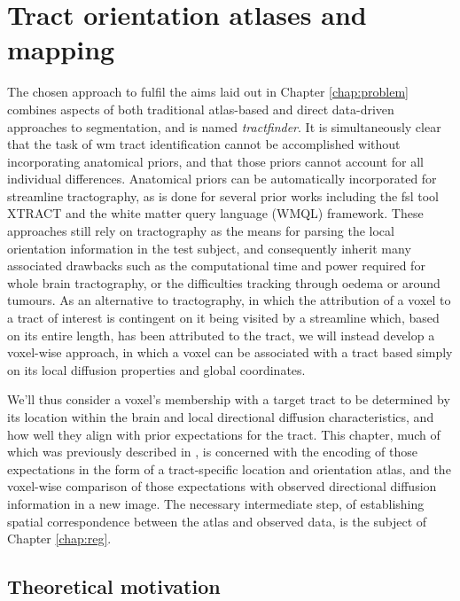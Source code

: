 \chapter{Tract orientation atlases and mapping}
\label{chap:atlas}

The chosen approach to fulfil the aims laid out in Chapter \ref{chap:problem} combines aspects of both traditional atlas-based and direct data-driven approaches to segmentation, and is named \textit{tractfinder}.
It is simultaneously clear that the task of \gls{wm} tract identification cannot be accomplished without incorporating anatomical priors, and that those priors cannot account for all individual differences.
Anatomical priors can be automatically incorporated for streamline tractography, as is done for several prior works including the \gls{fsl} tool XTRACT\autocite{Warrington2020} and the white matter query language (WMQL) framework\autocite{Wassermann2016}.
These approaches still rely on tractography as the means for parsing the local orientation information in the test subject, and consequently inherit many associated drawbacks such as the computational time and power required for whole brain tractography, or the difficulties tracking through oedema or around tumours.
As an alternative to tractography, in which the attribution of a voxel to a tract of interest is contingent on it being visited by a streamline which, based on its entire length, has been attributed to the tract, we will instead develop a voxel-wise approach, in which a voxel can be associated with a tract based simply on its local diffusion properties and global coordinates.

We'll thus consider a voxel's membership with a target tract to be determined by its location within the brain and local directional diffusion characteristics, and how well they align with prior expectations for the tract.
This chapter, much of which was previously described in \textcite{Young2024}, is concerned with the encoding of those expectations in the form of a tract-specific location and orientation atlas, and the voxel-wise comparison of those expectations with observed directional diffusion information in a new image.
The necessary intermediate step, of establishing spatial correspondence between the atlas and observed data, is the subject of Chapter \ref{chap:reg}.

\section{Theoretical motivation}

